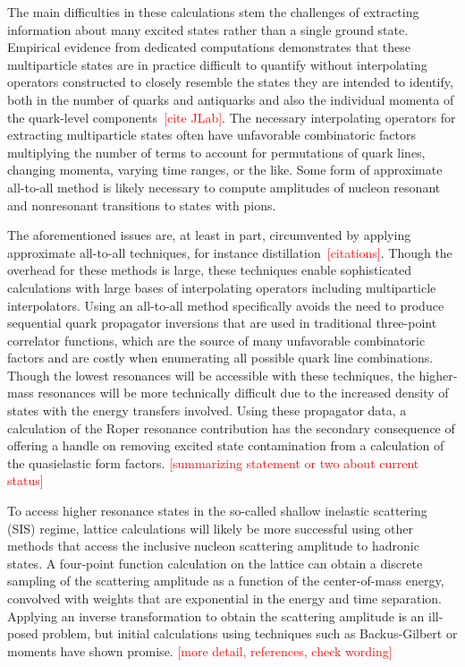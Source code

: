 The main difficulties in these calculations stem the challenges of extracting
 information about many excited states rather than a single ground state.
Empirical evidence from dedicated computations demonstrates that these multiparticle states
 are in practice difficult to quantify without interpolating operators constructed to
 closely resemble the states they are intended to identify,
 both in the number of quarks and antiquarks and also the individual
 momenta of the quark-level components~\textcolor{red}{[cite JLab]}.
The necessary interpolating operators for extracting multiparticle states often have
 unfavorable combinatoric factors multiplying the number of terms to account for
 permutations of quark lines, changing momenta, varying time ranges, or the like.
Some form of approximate all-to-all method is likely necessary
 to compute amplitudes of nucleon resonant and nonresonant transitions
 to states with pions.

The aforementioned issues are, at least in part, circumvented by applying approximate
 all-to-all techniques, for instance distillation~\textcolor{red}{[citations]}.
Though the overhead for these methods is large,
 these techniques enable sophisticated calculations with large bases
 of interpolating operators including multiparticle interpolators.
Using an all-to-all method specifically avoids the need to produce sequential
 quark propagator inversions that are used in traditional three-point correlator functions,
 which are the source of many unfavorable combinatoric factors and are
 costly when enumerating all possible quark line combinations.
Though the lowest resonances will be accessible with these techniques,
 the higher-mass resonances will be more technically difficult
 due to the increased density of states with the energy transfers involved.
Using these propagator data, a calculation of the Roper resonance contribution
 has the secondary consequence of offering a handle on removing excited
 state contamination from a calculation of the quasielastic form factors.
\textcolor{red}{[summarizing statement or two about current status]}

To access higher resonance states in the so-called shallow inelastic scattering (SIS) regime,
 lattice calculations will likely be more successful using other methods
 that access the inclusive nucleon scattering amplitude to hadronic states.
A four-point function calculation on the lattice can obtain a discrete sampling
 of the scattering amplitude as a function of the center-of-mass energy,
 convolved with weights that are exponential in the energy and time separation.
Applying an inverse transformation to obtain the scattering amplitude
 is an ill-posed problem, but initial calculations using techniques
 such as Backus-Gilbert or moments have shown promise.
\textcolor{red}{[more detail, references, check wording]}

